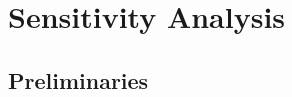 \chapter{Sensitivity Analysis} \label{ch:sa}


        



\section{Preliminaries} \label{sec:ch4_pre}

